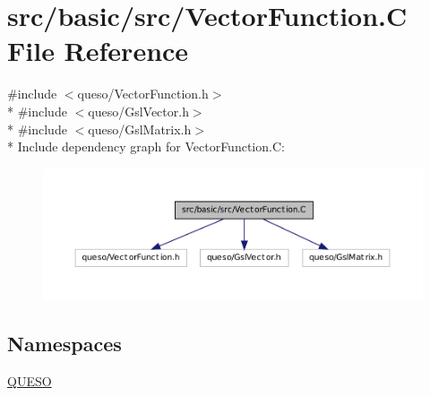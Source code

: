 \hypertarget{_vector_function_8_c}{\section{src/basic/src/\-Vector\-Function.C File Reference}
\label{_vector_function_8_c}
}
{\ttfamily \#include $<$queso/\-Vector\-Function.\-h$>$}\\*
{\ttfamily \#include $<$queso/\-Gsl\-Vector.\-h$>$}\\*
{\ttfamily \#include $<$queso/\-Gsl\-Matrix.\-h$>$}\\*
Include dependency graph for Vector\-Function.\-C\-:
\nopagebreak
\begin{figure}[H]
\begin{center}
\leavevmode
\includegraphics[width=350pt]{_vector_function_8_c__incl}
\end{center}
\end{figure}
\subsection*{Namespaces}
\begin{DoxyCompactItemize}
\item 
\hyperlink{namespace_q_u_e_s_o}{Q\-U\-E\-S\-O}
\end{DoxyCompactItemize}
